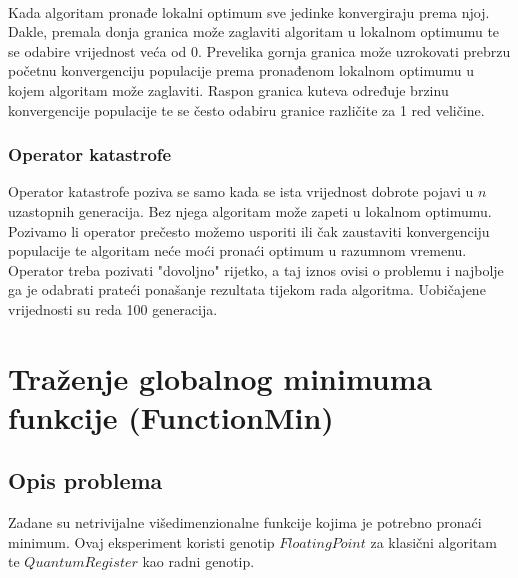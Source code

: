 \documentclass[times, utf8, zavrsni, numeric]{fer}
\begin{document}
\paragraph{}
Kada algoritam pronađe lokalni optimum sve jedinke konvergiraju prema njoj. Dakle, premala donja granica može zaglaviti algoritam u lokalnom optimumu te se odabire vrijednost veća od 0. Prevelika gornja granica može uzrokovati prebrzu početnu konvergenciju populacije prema pronađenom lokalnom optimumu u kojem algoritam može zaglaviti. Raspon granica kuteva određuje brzinu konvergencije populacije te se često odabiru granice različite za 1 red veličine.

\subsubsection{Operator katastrofe}
Operator katastrofe poziva se samo kada se ista vrijednost dobrote pojavi u $n$ uzastopnih generacija. Bez njega algoritam može zapeti u lokalnom optimumu. Pozivamo li operator prečesto možemo usporiti ili čak zaustaviti konvergenciju populacije te algoritam neće moći pronaći optimum u razumnom vremenu. Operator treba pozivati "dovoljno" rijetko, a taj iznos ovisi o problemu i najbolje ga je odabrati prateći ponašanje rezultata tijekom rada algoritma. Uobičajene vrijednosti su reda 100 generacija.

\clearpage

\section{Traženje globalnog minimuma funkcije (FunctionMin)}
\subsection{Opis problema}
Zadane su netrivijalne višedimenzionalne funkcije kojima je potrebno pronaći minimum.
Ovaj eksperiment koristi genotip $FloatingPoint$ za klasični algoritam te $QuantumRegister$ kao radni genotip.
\end{document}

